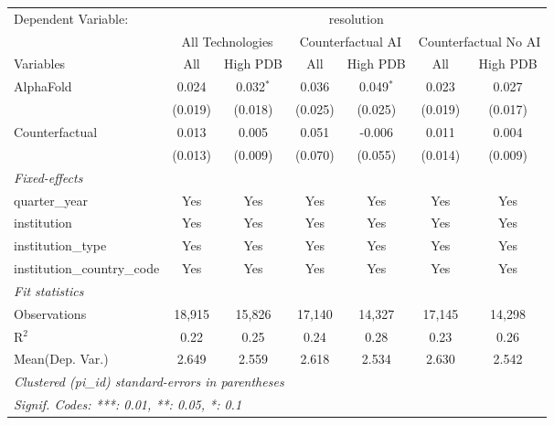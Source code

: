 \begingroup
\centering
\begin{tabular}{lcccccc}
   \tabularnewline \midrule \midrule
   Dependent Variable: & \multicolumn{6}{c}{resolution}\\
 & \multicolumn{2}{c}{All Technologies} & \multicolumn{2}{c}{Counterfactual AI} & \multicolumn{2}{c}{Counterfactual No AI} \\
\cmidrule(lr){1-1}\cmidrule(lr){2-3} \cmidrule(lr){4-5} \cmidrule(lr){6-7}
Variables & \multicolumn{1}{c}{All} & \multicolumn{1}{c}{High PDB} & \multicolumn{1}{c}{All} & \multicolumn{1}{c}{High PDB} & \multicolumn{1}{c}{All} & \multicolumn{1}{c}{High PDB} \\
\cmidrule(lr){1-1}\cmidrule(lr){2-2} \cmidrule(lr){3-3} \cmidrule(lr){4-4} \cmidrule(lr){5-5} \cmidrule(lr){6-6} \cmidrule(lr){7-7}
   AlphaFold                    & 0.024   & 0.032$^{*}$ & 0.036   & 0.049$^{*}$ & 0.023   & 0.027\\   
                                & (0.019) & (0.018)     & (0.025) & (0.025)     & (0.019) & (0.017)\\   
   Counterfactual               & 0.013   & 0.005       & 0.051   & -0.006      & 0.011   & 0.004\\   
                                & (0.013) & (0.009)     & (0.070) & (0.055)     & (0.014) & (0.009)\\   
   \midrule
   \emph{Fixed-effects}\\
   quarter\_year                & Yes     & Yes         & Yes     & Yes         & Yes     & Yes\\  
   institution                  & Yes     & Yes         & Yes     & Yes         & Yes     & Yes\\  
   institution\_type            & Yes     & Yes         & Yes     & Yes         & Yes     & Yes\\  
   institution\_country\_code   & Yes     & Yes         & Yes     & Yes         & Yes     & Yes\\  
   \midrule
   \emph{Fit statistics}\\
   Observations                 & 18,915  & 15,826      & 17,140  & 14,327      & 17,145  & 14,298\\  
   R$^2$                        & 0.22    & 0.25        & 0.24    & 0.28        & 0.23    & 0.26\\  
Mean(Dep. Var.) & 2.649 & 2.559 & 2.618 & 2.534 & 2.630 & 2.542 \\
   \midrule \midrule
   \multicolumn{7}{l}{\emph{Clustered (pi\_id) standard-errors in parentheses}}\\
   \multicolumn{7}{l}{\emph{Signif. Codes: ***: 0.01, **: 0.05, *: 0.1}}\\
\end{tabular}
\par\endgroup
